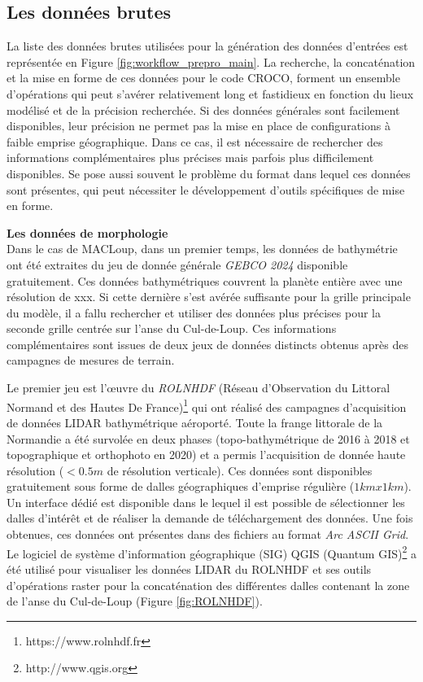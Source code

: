 \documentclass[10pt,a4paper,titlepage]{article}
\begin{document}
\subsection{Les données brutes}

La liste des données brutes utilisées pour la génération des données d'entrées est représentée en Figure \ref{fig:workflow_prepro_main}. La recherche, la concaténation et la mise en forme de ces données pour le code CROCO, forment un ensemble d'opérations qui peut s'avérer relativement long et fastidieux en fonction du lieux modélisé et de la précision recherchée. Si des données générales sont facilement disponibles, leur précision ne permet pas la mise en place de configurations à faible emprise géographique. Dans ce cas, il est nécessaire de rechercher des informations complémentaires plus précises mais parfois plus difficilement disponibles. Se pose aussi souvent le problème du format dans lequel ces données sont présentes, qui peut nécessiter le développement d'outils spécifiques de mise en forme.

\textbf{Les données de morphologie}\\
Dans le cas de MACLoup, dans un premier temps, les données de bathymétrie ont été extraites du jeu de donnée générale \textit{GEBCO 2024} disponible gratuitement. Ces données bathymétriques couvrent la planète entière avec une résolution de \alert{xxx}. Si cette dernière s'est avérée suffisante pour la grille principale du modèle, il a fallu rechercher et utiliser des données plus précises pour la seconde grille centrée sur l'anse du Cul-de-Loup. Ces informations complémentaires sont issues de deux jeux de données distincts obtenus après des campagnes de mesures de terrain.

Le premier jeu est l'\oe{}uvre du \textit{ROLNHDF} (Réseau d'Observation du Littoral Normand et des Hautes De France)\footnote{https://www.rolnhdf.fr} qui ont réalisé des campagnes d'acquisition de données LIDAR bathymétrique aéroporté. Toute la frange littorale de la Normandie a été survolée en deux phases (topo-bathymétrique de 2016 à 2018 et topographique et orthophoto en 2020) et a permis l'acquisition de donnée haute résolution ($<0.5 m$ de résolution verticale). Ces données sont disponibles gratuitement sous forme de dalles géographiques d'emprise régulière ($1 km x 1 km$). Un interface dédié est disponible dans le lequel il est possible de sélectionner les dalles d'intérêt et de réaliser la demande de téléchargement des données. Une fois obtenues, ces données ont présentes dans des fichiers au format \textit{Arc ASCII Grid}. Le logiciel de système d'information géographique (SIG) QGIS (Quantum GIS)\footnote{http://www.qgis.org} a été utilisé pour visualiser les données LIDAR du ROLNHDF et ses outils d'opérations raster pour la concaténation des différentes dalles contenant la zone de l'anse du Cul-de-Loup (Figure \ref{fig:ROLNHDF}).
\end{document}
